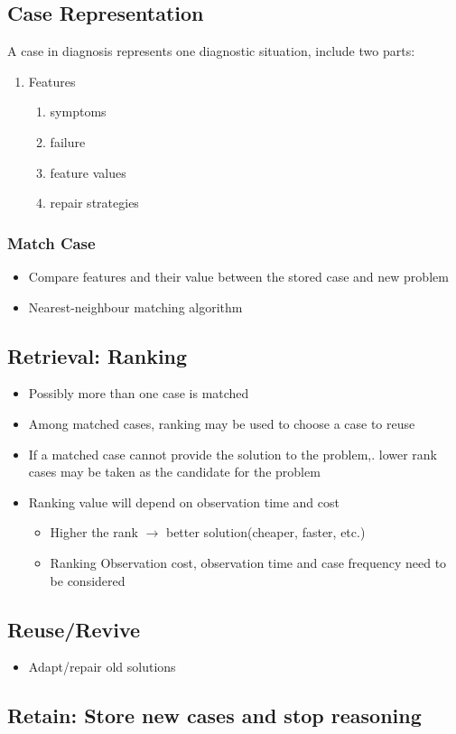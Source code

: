 \subsection{Case Representation}
A case in diagnosis represents one diagnostic situation, include two parts:\\
\begin{enumerate}
\item Features
\begin{enumerate}
\item symptoms
\item failure
\item feature values
\item repair strategies
\end{enumerate}
\end{enumerate}

\subsubsection{Match Case}
\begin{itemize}
\item Compare features and their value between the stored case and new problem
\item Nearest-neighbour matching algorithm
\end{itemize}

\subsection{Retrieval: Ranking}
\begin{itemize}
\item Possibly more than one case is matched
\item Among matched cases, ranking may be used to choose a case to reuse
\item If a matched case cannot provide the solution to the problem,. lower rank cases may be taken as the candidate for the problem
\item Ranking value will depend on observation time and cost
\begin{itemize}
\item Higher the rank $\longrightarrow$ better solution(cheaper, faster, etc.)
\item Ranking Observation cost, observation time and case frequency need to be considered
\end{itemize}
\end{itemize}

\subsection{Reuse/Revive}
\begin{itemize}
\item Adapt/repair old solutions
\end{itemize}

\subsection{Retain: Store new cases and stop reasoning}

